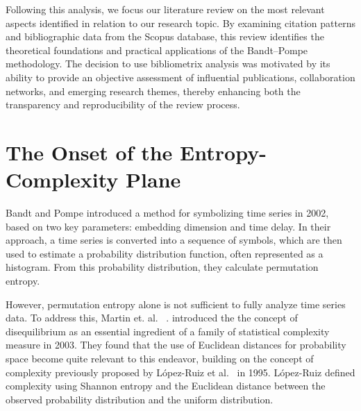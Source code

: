 Following this analysis, we focus our literature review on the most relevant aspects identified in relation to our research topic. By examining citation patterns and bibliographic data from the Scopus database, this review identifies the theoretical foundations and practical applications of the Bandt–Pompe methodology. The decision to use bibliometrix analysis was motivated by its ability to provide an objective assessment of influential publications, collaboration networks, and emerging research themes, thereby enhancing both the transparency and reproducibility of the review process.


\section{The Onset of the Entropy-Complexity Plane}




Bandt and Pompe introduced a method for symbolizing time series in 2002, based on two key parameters: embedding dimension and time delay. In their approach, a time series is converted into a sequence of symbols, which are then used to estimate a probability distribution function, often represented as a histogram. From this probability distribution, they calculate permutation entropy.

However, permutation entropy alone is not sufficient to fully analyze time series data. To address this, Martin et. al.~
\cite{Martin2003}. introduced the the concept of disequilibrium as an essential ingredient of a family of statistical complexity measure in 2003. They found that the use of Euclidean distances for probability space become quite relevant to this endeavor, building on the concept of complexity previously proposed by López-Ruiz et al.~\cite{lopez1995statistical} in 1995. López-Ruiz defined complexity using Shannon entropy and the Euclidean distance between the observed probability distribution and the uniform distribution.

